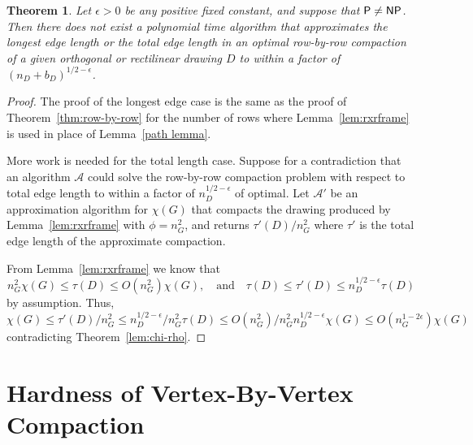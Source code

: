 \documentclass[12pt]{article}
\newtheorem{theorem}{Theorem}
\theoremstyle{definitions}
\renewcommand{\P}{\mathsf{P}}
\newcommand{\NP}{\mathsf{NP}}
\begin{document}
\begin{theorem}
\label{thm:row-by-row-edgeSum}
Let $\epsilon>0$ be any positive fixed constant, and suppose that
$\P\neq\nobreak\NP$.
Then there does not exist a polynomial time algorithm that
approximates the longest edge length or the total edge length in an optimal row-by-row compaction of a given orthogonal or rectilinear drawing $D$ to within a factor of $(n_D+b_D)^{1/2-\epsilon}$. 
\end{theorem}
\begin{proof}
The proof of the longest edge case is the same as the proof of Theorem~\ref{thm:row-by-row} for the number of rows where Lemma~\ref{lem:rxrframe} is used in place of Lemma~\ref{path lemma}.

More work is needed for the total length case. Suppose for a contradiction that an algorithm
$\mathcal{A}$ could solve the row-by-row compaction problem with respect to total
edge length to within a factor of $n_D^{1/2-\epsilon}$ of optimal. Let
$\mathcal{A}'$ be an approximation algorithm for $\chi(G)$ that compacts the drawing produced by Lemma~\ref{lem:rxrframe} with $\phi = n_G^2$, and returns $\tau'(D)/n^2_G$ where $\tau'$ is the total edge length of the approximate compaction.

From Lemma~\ref{lem:rxrframe} we know that
\[
n^2_G \chi(G) \leq \tau(D) \leq O(n^2_G)\chi(G),
\quad\text{and}\quad
\tau(D) \leq \tau'(D) \leq n_D^{1/2 - \epsilon}\tau(D)
\]
by assumption. Thus,
\[
\chi(G) \leq \tau'(D)/n_G^2 \leq n_D^{1/2-\epsilon}/n_G^2 \tau(D)
\leq O(n_G^2)/n_G^2 n_D^{1/2 - \epsilon} \chi(G)
\leq O(n_G^{1-2\epsilon}) \chi(G)
\]
contradicting Theorem~\ref{lem:chi-rho}.
\end{proof}

\section{Hardness of Vertex-By-Vertex Compaction}
\label{section:vertex-vertex}
\end{document}
